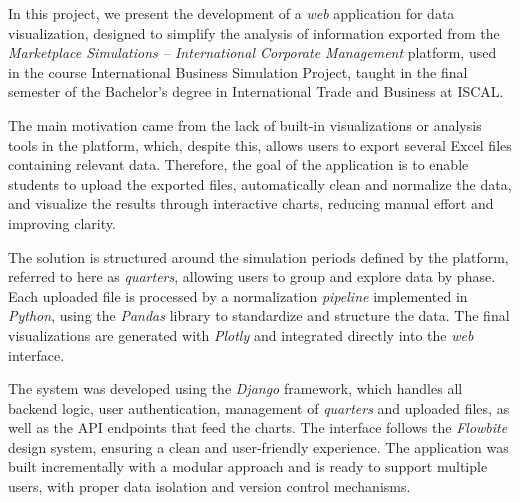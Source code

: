 
In this project, we present the development of a \textit{web} application for data visualization, designed to simplify the analysis of information exported from the \textit{Marketplace Simulations – International Corporate Management} platform, used in the course International Business Simulation Project, taught in the final semester of the Bachelor's degree in International Trade and Business at ISCAL.

The main motivation came from the lack of built-in visualizations or analysis tools in the platform, which, despite this, allows users to export several Excel files containing relevant data. Therefore, the goal of the application is to enable students to upload the exported files, automatically clean and normalize the data, and visualize the results through interactive charts, reducing manual effort and improving clarity.

The solution is structured around the simulation periods defined by the platform, referred to here as \textit{quarters}, allowing users to group and explore data by phase. Each uploaded file is processed by a normalization \textit{pipeline} implemented in \textit{Python}, using the \textit{Pandas} library to standardize and structure the data. The final visualizations are generated with \textit{Plotly} and integrated directly into the \textit{web} interface.

The system was developed using the \textit{Django} framework, which handles all backend logic, user authentication, management of \textit{quarters} and uploaded files, as well as the API endpoints that feed the charts. The interface follows the \textit{Flowbite} design system, ensuring a clean and user-friendly experience. The application was built incrementally with a modular approach and is ready to support multiple users, with proper data isolation and version control mechanisms.